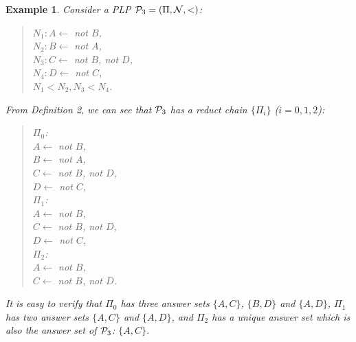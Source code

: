 \documentclass{tlp}
\newtheorem{example}{Example} %
\begin{document}
\begin{example}
Consider a PLP ${\cal P}_{3}=(\Pi,{\cal N},<)$:
\begin{quote}
$N_{1}: A\leftarrow$ {\em not} $B$,\\
\hspace*{.1in} $N_{2}: B\leftarrow$ {\em not} $A$,\\
\hspace*{.1in} $N_{3}: C\leftarrow$ {\em not} $B$, {\em not} $D$,\\
\hspace*{.1in} $N_{4}: D\leftarrow$ {\em not} $C$,\\
\hspace*{.1in} $N_{1}<N_{2}, N_{3}<N_{4}$.
\end{quote}
From Definition 2, we can see that ${\cal P}_{3}$ has a reduct chain
$\{\Pi_{i}\}$ ($i=0,1,2$):
\begin{quote}
$\Pi_{0}$:\\
\hspace*{.2in} $A\leftarrow$ {\em not} $B$,\\
\hspace*{.2in} $B\leftarrow$ {\em not} $A$,\\
\hspace*{.2in} $C\leftarrow$ {\em not} $B$, {\em not} $D$,\\
\hspace*{.2in} $D\leftarrow$ {\em not} $C$,\\
\hspace*{.1in} $\Pi_{1}$:\\
\hspace*{.2in} $A\leftarrow$ {\em not} $B$,\\
\hspace*{.2in} $C\leftarrow$ {\em not} $B$, {\em not} $D$,\\
\hspace*{.2in} $D\leftarrow$ {\em not} $C$,\\
\hspace*{.1in} $\Pi_{2}$:\\
\hspace*{.2in} $A\leftarrow$ {\em not} $B$,\\
\hspace*{.2in} $C\leftarrow$ {\em not} $B$, {\em not} $D$.
\end{quote}
It is easy to verify that $\Pi_{0}$ has three answer sets
$\{A,C\}$, $\{B,D\}$ and $\{A,D\}$,
$\Pi_{1}$ has two answer sets $\{A,C\}$ and $\{A,D\}$, and
$\Pi_{2}$ has a unique answer set which is also the answer set
of ${\cal P}_{3}$: $\{A,C\}$.
\end{example}
\end{document}
